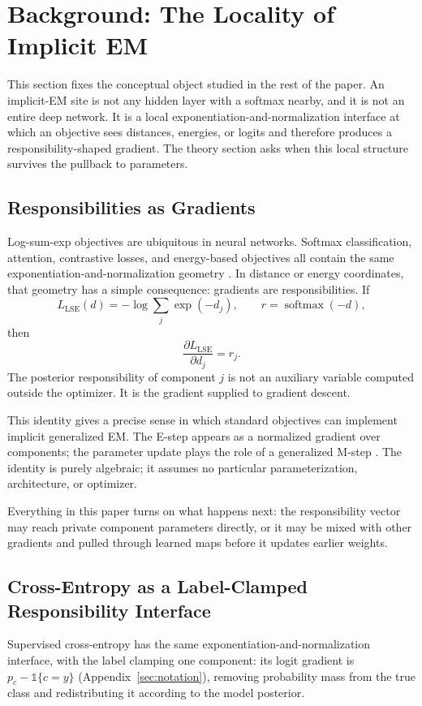 \section{Background: The Locality of Implicit EM}
\label{sec:background}
This section fixes the conceptual object studied in the rest of the paper. An
implicit-EM site is not any hidden layer with a softmax nearby, and it is not
an entire deep network. It is a local exponentiation-and-normalization
interface at which an objective sees distances, energies, or logits and
therefore produces a responsibility-shaped gradient. The theory section asks
when this local structure survives the pullback to parameters.

\subsection{Responsibilities as Gradients}
Log-sum-exp objectives are ubiquitous in neural networks. Softmax
classification, attention, contrastive losses, and energy-based objectives all
contain the same exponentiation-and-normalization geometry
\citep{vaswani2017attention,agarwal2025gradient,oord2018representation,lecun2006tutorial}.
In distance or energy coordinates, that geometry has a simple consequence:
gradients are responsibilities. If
\[
    L_{\mathrm{LSE}}(d)
    =
    -\log \sum_j \exp(-d_j),
    \qquad
    r=\operatorname{softmax}(-d),
\]
then
\[
    \frac{\partial L_{\mathrm{LSE}}}{\partial d_j}=r_j.
\]
The posterior responsibility of component $j$ is not an auxiliary variable
computed outside the optimizer. It is the gradient supplied to gradient
descent.

This identity gives a precise sense in which standard objectives can
implement implicit generalized EM. The E-step appears as a normalized gradient
over components; the parameter update plays the role of a generalized M-step
\citep{dempster1977maximum,neal1998view,xu1996convergence}. The identity is
purely algebraic; it assumes no particular parameterization, architecture, or
optimizer.

Everything in this paper turns on what happens next: the responsibility vector
may reach private component parameters directly, or it may be mixed with other
gradients and pulled through learned maps before it updates earlier weights.

\subsection{Cross-Entropy as a Label-Clamped Responsibility Interface}
Supervised cross-entropy has the same exponentiation-and-normalization
interface, with the label clamping one component: its logit gradient is
$p_c-\mathbb{1}\{c=y\}$ (Appendix~\ref{sec:notation}), removing probability
mass from the true class and redistributing it according to the model
posterior.

